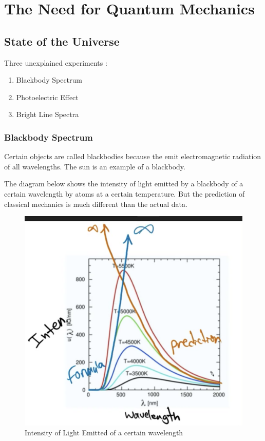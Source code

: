 

\chapter{The Need for Quantum Mechanics}

\bigbreak
\section{State of the Universe}

Three unexplained experiments :
\begin{enumerate}
	\item Blackbody Spectrum
	\item Photoelectric Effect
	\item Bright Line Spectra
\end{enumerate}

\subsection{Blackbody Spectrum}
Certain objects are called blackbodies because the emit electromagnetic radiation of all wavelengths. The sun is an example of a blackbody.

The diagram below shows the intensity of light emitted by a blackbody of a certain wavelength by atoms at a certain temperature.
But the prediction of classical mechanics is much different than the actual data.

\begin{figure}[ht!]
	\centering
	\includegraphics[scale=0.5]{./images/lecture_1_figure_1.png}
	\caption{Intensity of Light Emitted of a certain wavelength}
\end{figure}

